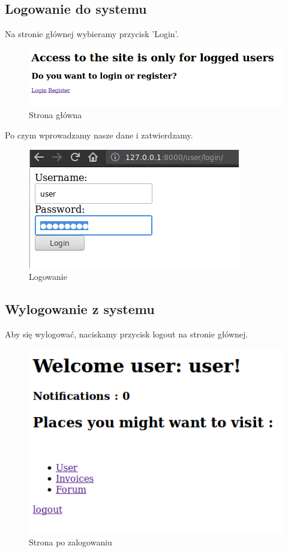 \documentclass[12pt]{article}
\begin{document}
	\subsection{Logowanie do systemu}
	Na stronie głównej wybieramy przycisk 'Login'.
	\begin{figure}[H]
		\centering
		\includegraphics[scale=0.5]{img/1.png}
		\caption{Strona główna}
	\end{figure}
	Po czym wprowadzamy nasze dane i zatwierdzamy.
	\begin{figure}[H]
		\centering
		\includegraphics[scale=0.5]{img/4.png}
		\caption{Logowanie}
	\end{figure}
	
	\subsection{Wylogowanie z systemu}
	Aby się wylogować, naciskamy przycisk logout na stronie głównej.
	\begin{figure}[H]
		\centering
		\includegraphics[scale=0.5]{img/3.png}
		\caption{Strona po zalogowaniu}
	\end{figure}
\end{document}
